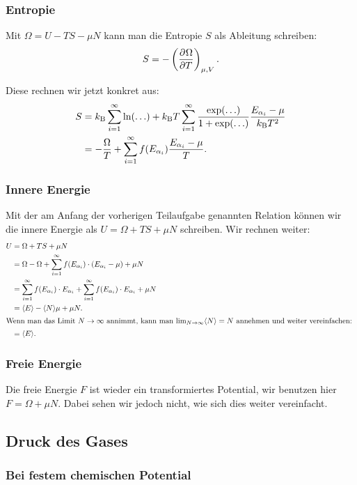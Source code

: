 \subsubsection{Entropie}

Mit $\Omega = U - TS - \mu N$ kann man die Entropie $S$ als Ableitung schreiben:
\[
    S = - \tdpd\Omega T{\mu, V}.
\]

Diese rechnen wir jetzt konkret aus:
\begin{align*}
    S &= k_\text B \sum_{i=1}^\infty \ln(\ldots) + k_\text B T \sum_{i=1}^\infty \frac{\exp(\ldots)}{1 + \exp(\ldots)} \frac{E_{\alpha_i} - \mu}{k_\text B T^2} \\
      &= - \frac\Omega T + \sum_{i=1}^\infty f(E_{\alpha_i}) \frac{E_{\alpha_i} - \mu}T.
\end{align*}

\subsubsection{Innere Energie}

Mit der am Anfang der vorherigen Teilaufgabe genannten Relation können wir die innere Energie als $U = \Omega + TS + \mu N$ schreiben. Wir rechnen weiter:
\begin{align*}
    U &= \Omega + TS + \mu N \\
      &= \Omega - \Omega + \isum f(\Eai) \cdot (\Eai - \mu) + \mu N \\
      &= \isum f(\Eai) \cdot \Eai + \isum f(\Eai) \cdot \Eai + \mu N \\
      &= \bracket E - \bracket N \mu + \mu N. \\
    \intertext{%
        Wenn man das Limit $N \to \infty$ annimmt, kann man $\lim_{N\to\infty}
        \bracket N = N$ annehmen und weiter vereinfachen:
    }
      &= \bracket E.
\end{align*}

\subsubsection{Freie Energie}

Die freie Energie $F$ ist wieder ein transformiertes Potential, wir benutzen
hier $F = \Omega + \mu N$. Dabei sehen wir jedoch nicht, wie sich dies weiter
vereinfacht.

\subsection{Druck des Gases}

\subsubsection{Bei festem chemischen Potential}

